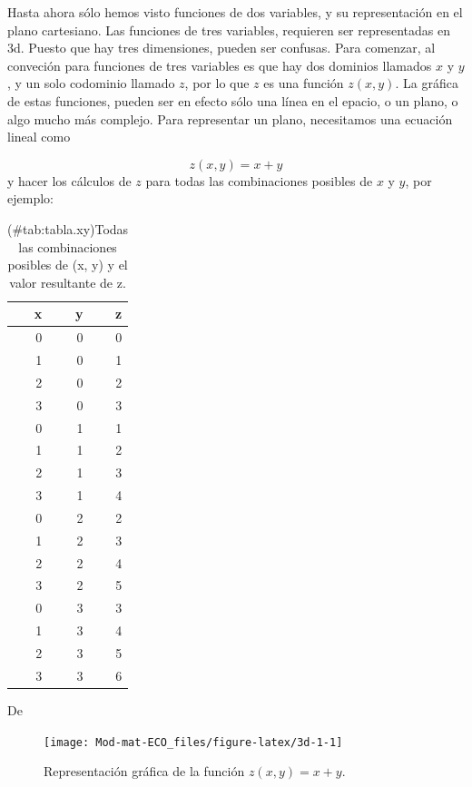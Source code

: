 \documentclass[
]{book}
\begin{document}
Hasta ahora sólo hemos visto funciones de dos variables, y su representación en el plano cartesiano. Las funciones de tres variables, requieren ser representadas en 3d. Puesto que hay tres dimensiones, pueden ser confusas. Para comenzar, al conveción para funciones de tres variables es que hay dos dominios llamados \(x\) y \(y\), y un solo codominio llamado \(z\), por lo que \(z\) es una función \(z(x, y)\). La gráfica de estas funciones, pueden ser en efecto sólo una línea en el epacio, o un plano, o algo mucho más complejo. Para representar un plano, necesitamos una ecuación lineal como

\[z(x, y) = x + y\]
y hacer los cálculos de \(z\) para todas las combinaciones posibles de \(x\) y \(y\), por ejemplo:

\begin{table}

\caption{(\#tab:tabla.xy)Todas las combinaciones posibles de (x, y) y el valor resultante de z.}
\centering
\begin{tabular}[t]{r|r|r}
\hline
x & y & z\\
\hline
0 & 0 & 0\\
\hline
1 & 0 & 1\\
\hline
2 & 0 & 2\\
\hline
3 & 0 & 3\\
\hline
0 & 1 & 1\\
\hline
1 & 1 & 2\\
\hline
2 & 1 & 3\\
\hline
3 & 1 & 4\\
\hline
0 & 2 & 2\\
\hline
1 & 2 & 3\\
\hline
2 & 2 & 4\\
\hline
3 & 2 & 5\\
\hline
0 & 3 & 3\\
\hline
1 & 3 & 4\\
\hline
2 & 3 & 5\\
\hline
3 & 3 & 6\\
\hline
\end{tabular}
\end{table}

De

\begin{figure}

{\centering \texttt{[image: Mod-mat-ECO\_files/figure-latex/3d-1-1]} 

}

\caption{Representación gráfica de la función $z(x, y) = x + y$.}\label{fig:3d-1}
\end{figure}
\end{document}

